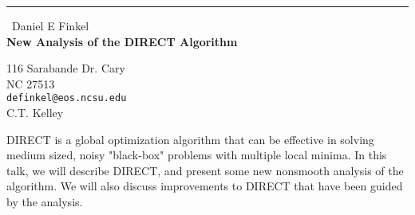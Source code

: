 \documentclass{report}
\begin{document}
\begin{center}
\rule{6in}{1pt} \
{\large Daniel E Finkel \\
{\bf New Analysis of the DIRECT Algorithm}}

116 Sarabande Dr. Cary \\ NC 27513
\\
{\tt definkel@eos.ncsu.edu}\\
C.T. Kelley\end{center}

DIRECT is a global optimization algorithm that can be effective in
solving medium sized, noisy "black-box" problems with multiple local
minima. In this talk, we will describe DIRECT, and present some new
nonsmooth analysis of the algorithm. We will also discuss improvements to
DIRECT that have been guided by the analysis.
\end{document}
